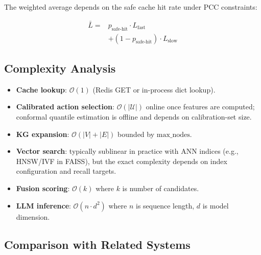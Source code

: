 \documentclass[11pt,a4paper,twocolumn]{article}
\newcommand{\bigO}{\mathcal{O}}
\begin{document}
The weighted average depends on the safe cache hit rate under PCC constraints:

\begin{equation}
\begin{aligned}
\bar{L} ={}& p_\text{safe-hit} \cdot L_\text{fast} \\
& + (1 - p_\text{safe-hit}) \cdot L_\text{slow}
\end{aligned}
\end{equation}

\subsection{Complexity Analysis}

\begin{itemize}[leftmargin=*]
  \item \textbf{Cache lookup}: $\bigO(1)$ (Redis GET or in-process dict lookup).
  \item \textbf{Calibrated action selection}: $\bigO(|\mathcal{U}|)$ online once features are computed; conformal quantile estimation is offline and depends on calibration-set size.
  \item \textbf{KG expansion}: $\bigO(|V| + |E|)$ bounded by $\text{max\_nodes}$.
  \item \textbf{Vector search}: typically sublinear in practice with ANN indices (e.g., HNSW/IVF in FAISS), but the exact complexity depends on index configuration and recall targets.
  \item \textbf{Fusion scoring}: $\bigO(k)$ where $k$ is number of candidates.
  \item \textbf{LLM inference}: $\bigO(n \cdot d^2)$ where $n$ is sequence length, $d$ is model dimension.
\end{itemize}

\subsection{Comparison with Related Systems}
\end{document}
